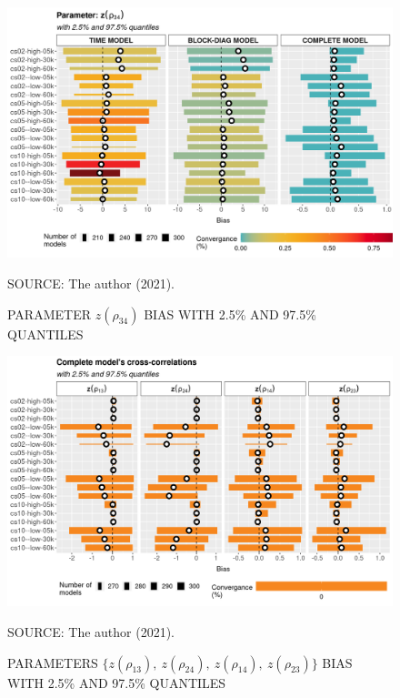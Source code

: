 \documentclass[12pt, %
               openright, %
               oneside, %
               a4paper, %
               chapter=TITLE, %
               section=TITLE, %
               brazil,
               english %
]{abntex2}
\begin{document}
\begin{apendicesenv}
\begin{figure}[H]
 \setlength{\abovecaptionskip}{.0001pt}
 \caption{PARAMETER \(z(\rho_{34})\) BIAS WITH 2.5\% AND 97.5\%
          QUANTILES}
 \vspace{0.2cm}\centering
 \includegraphics[width=\textwidth]{bias2plot-12.png}\\
 \begin{footnotesize}
  SOURCE: The author (2021).
 \end{footnotesize}
 \label{fig:biasrhoz34}
\end{figure}

\begin{figure}[H]
 \setlength{\abovecaptionskip}{.0001pt}
 \caption{PARAMETERS
          \(\{z(\rho_{13}),~z(\rho_{24}),~z(\rho_{14}),~z(\rho_{23})\}\)
          BIAS WITH 2.5\% AND 97.5\% QUANTILES}
 \vspace{0.2cm}\centering
 \includegraphics[width=\textwidth]{bias2plot-13.png}\\
 \begin{footnotesize}
  SOURCE: The author (2021).
 \end{footnotesize}
 \label{fig:biasrhoz4}
\end{figure}

\end{apendicesenv}
\end{document}
